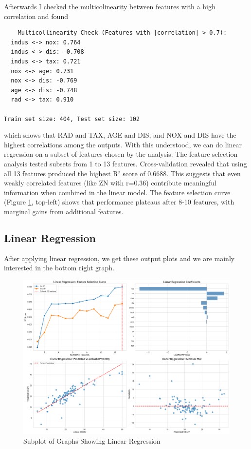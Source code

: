 \documentclass[12pt]{article}
\begin{document}
Afterwards I checked the multicolinearity between features with a high correlation and found 

\begin{lstlisting}
    Multicollinearity Check (Features with |correlation| > 0.7):
  indus <-> nox: 0.764
  indus <-> dis: -0.708
  indus <-> tax: 0.721
  nox <-> age: 0.731
  nox <-> dis: -0.769
  age <-> dis: -0.748
  rad <-> tax: 0.910

Train set size: 404, Test set size: 102
\end{lstlisting}

which shows that RAD and TAX, AGE and DIS, and NOX and DIS have the highest correlations among the outputs. With this understood, we can do linear regression on a subset of features chosen by the analysis.
The feature selection analysis tested subsets from 1 to 13 features. Cross-validation revealed that using all 13 features produced the highest R² score of 0.6688. This suggests that even weakly correlated features (like ZN with r=0.36) contribute meaningful information when combined in the linear model. The feature selection curve (Figure \ref{fig:linearregression}, top-left) shows that performance plateaus after 8-10 features, with marginal gains from additional features.

\subsection{Linear Regression}

After applying linear regression, we get these output plots and we are mainly interested in the bottom right graph.

\begin{figure}[H]
    \centering
    \includegraphics[width=0.85\linewidth]{images/02_linear_regression.png}
    \caption{Subplot of Graphs Showing Linear Regression}
    \label{fig:linearregression}
\end{figure}
\end{document}
